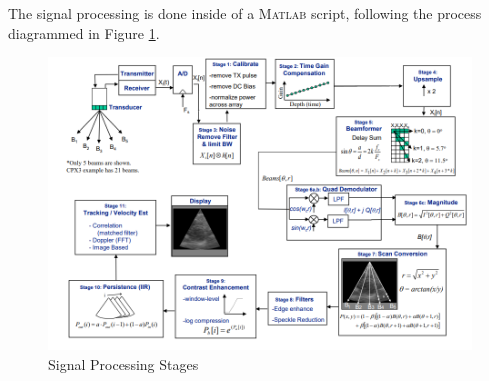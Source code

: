 The signal processing is done inside of a \textsc{Matlab} script, following the process diagrammed in Figure \ref{fig:stages}. 

\begin{figure}[H]
    \centering
    \includegraphics[width=0.75\linewidth]{figures/stages.png}
    \caption{Signal Processing Stages}
    \label{fig:stages}
\end{figure}
